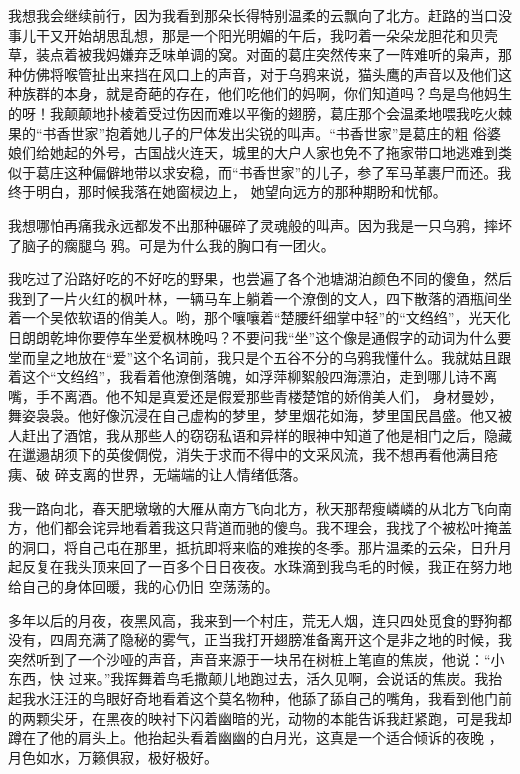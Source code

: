 \documentclass{article}
\begin{document}
我想我会继续前行，因为我看到那朵长得特别温柔的云飘向了北方。赶路的当口没事儿干又开始胡思乱想，那是一个阳光明媚的午后，我叼着一朵朵龙胆花和贝壳草，装点着被我妈嫌弃乏味单调的窝。对面的葛庄突然传来了一阵难听的枭声，那种仿佛将喉管扯出来挡在风口上的声音，对于乌鸦来说，猫头鹰的声音以及他们这种族群的本身，就是奇葩的存在，他们吃他们的妈啊，你们知道吗？鸟是鸟他妈生的呀！我颠颠地扑棱着受过伤因而难以平衡的翅膀，葛庄那个会温柔地喂我吃火棘果的“书香世家”抱着她儿子的尸体发出尖锐的叫声。“书香世家”是葛庄的粗
\newpage
俗婆娘们给她起的外号，古国战火连天，城里的大户人家也免不了拖家带口地逃难到类似于葛庄这种偏僻地带以求安稳，而“书香世家”的儿子，参了军马革裹尸而还。我终于明白，那时候我落在她窗棂边上，
她望向远方的那种期盼和忧郁。 

我想哪怕再痛我永远都发不出那种碾碎了灵魂般的叫声。因为我是一只乌鸦，摔坏了脑子的瘸腿乌
鸦。可是为什么我的胸口有一团火。 

我吃过了沿路好吃的不好吃的野果，也尝遍了各个池塘湖泊颜色不同的傻鱼，然后我到了一片火红的枫叶林，一辆马车上躺着一个潦倒的文人，四下散落的酒瓶间坐着一个吴侬软语的俏美人。哟，那个嚷嚷着“楚腰纤细掌中轻”的“文绉绉”，光天化日朗朗乾坤你要停车坐爱枫林晚吗？不要问我“坐”这个像是通假字的动词为什么要堂而皇之地放在“爱”这个名词前，我只是个五谷不分的乌鸦我懂什么。我就姑且跟着这个“文绉绉”，我看着他潦倒落魄，如浮萍柳絮般四海漂泊，走到哪儿诗不离嘴，手不离酒。他不知是真爱还是假爱那些青楼楚馆的娇俏美人们，
\newpage
身材曼妙，舞姿袅袅。他好像沉浸在自己虚构的梦里，梦里烟花如海，梦里国民昌盛。他又被人赶出了酒馆，我从那些人的窃窃私语和异样的眼神中知道了他是相门之后，隐藏在邋遢胡须下的英俊倜傥，消失于求而不得中的文采风流，我不想再看他满目疮痍、破
碎支离的世界，无端端的让人情绪低落。 

我一路向北，春天肥墩墩的大雁从南方飞向北方，秋天那帮瘦嶙嶙的从北方飞向南方，他们都会诧异地看着我这只背道而驰的傻鸟。我不理会，我找了个被松叶掩盖的洞口，将自己屯在那里，抵抗即将来临的难挨的冬季。那片温柔的云朵，日升月起反复在我头顶来回了一百多个日日夜夜。水珠滴到我鸟毛的时候，我正在努力地给自己的身体回暖，我的心仍旧
空荡荡的。 

多年以后的月夜，夜黑风高，我来到一个村庄，荒无人烟，连只四处觅食的野狗都没有，四周充满了隐秘的雾气，正当我打开翅膀准备离开这个是非之地的时候，我突然听到了一个沙哑的声音，声音来源于一块吊在树桩上笔直的焦炭，他说：“小东西，快
\newpage
过来。”我挥舞着鸟毛撒颠儿地跑过去，活久见啊，会说话的焦炭。我抬起我水汪汪的鸟眼好奇地看着这个莫名物种，他舔了舔自己的嘴角，我看到他门前的两颗尖牙，在黑夜的映衬下闪着幽暗的光，动物的本能告诉我赶紧跑，可是我却蹲在了他的肩头上。他抬起头看着幽幽的白月光，这真是一个适合倾诉的夜晚
，月色如水，万籁俱寂，极好极好。 
\end{document}
